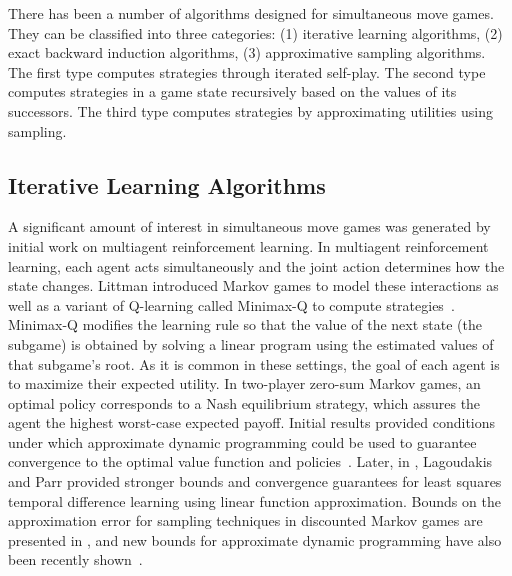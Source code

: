 
There has been a number of algorithms designed for simultaneous move games. They can be classified into three categories: 
(1) iterative learning algorithms, 
(2) exact backward induction algorithms, 
(3) approximative sampling algorithms.
The first type computes strategies through iterated self-play.
The second type computes strategies in a game state recursively based on the values of its successors.
The third type computes strategies by approximating utilities using sampling. 

\subsection{Iterative Learning Algorithms}



A significant amount of interest in simultaneous move games was generated by initial work 
on multiagent reinforcement learning. In multiagent reinforcement learning, each agent acts simultaneously and 
the joint action determines how the state changes. Littman introduced Markov games to model these interactions 
as well as a variant of Q-learning called Minimax-Q to compute strategies~\cite{Littman94markovgames,Littman01Value}.
Minimax-Q modifies the learning rule so that the value of the next state (the subgame) is obtained by solving
a linear program using the estimated values of that subgame's root.
As it is common in these settings, the goal of each agent is to maximize their expected utility. 
In two-player zero-sum Markov games, an optimal policy corresponds to a Nash equilibrium strategy, which assures the agent 
the highest worst-case expected payoff. Initial results provided conditions under which approximate dynamic 
programming could be used to guarantee convergence to the optimal value function and 
policies~\cite{Littman96ageneralized}. Later, in \cite{Lagoudakis02}, Lagoudakis and Parr provided stronger bounds 
and convergence guarantees for least squares temporal difference learning using linear function approximation. 
Bounds on the approximation error for sampling techniques in discounted Markov games are presented in \cite{Savagaonkar02}, 
and new bounds for approximate dynamic programming have also been recently shown~\cite{Perolat15Approximate}.

